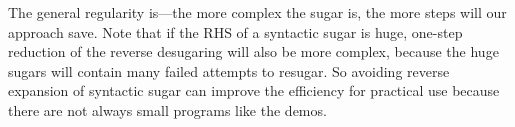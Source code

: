The general regularity is---the more complex the sugar is, the more steps will our approach save. Note that if the RHS of a syntactic sugar is huge, one-step reduction of the reverse desugaring will also be more complex, because the huge sugars will contain many failed attempts to resugar. So avoiding reverse expansion of syntactic sugar can improve the efficiency for practical use because there are not always small programs like the demos.